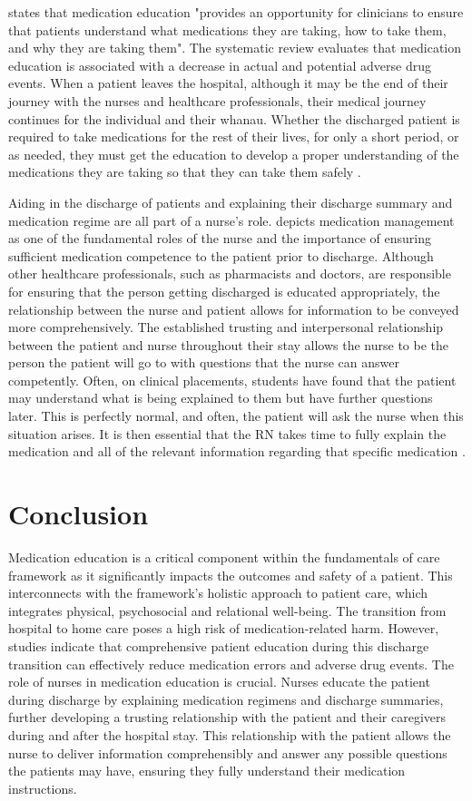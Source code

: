 \documentclass[british,12pt,a4paper]{article}
\begin{document}
\citeauthor{Alper2023} states that medication education "provides an opportunity for clinicians to ensure that patients understand what medications they are taking, how to take them, and why they are taking them". The systematic review evaluates that medication education is associated with a decrease in actual and potential adverse drug events. When a patient leaves the hospital, although it may be the end of their journey with the nurses and healthcare professionals, their medical journey continues for the individual and their whanau. Whether the discharged patient is required to take medications for the rest of their lives, for only a short period, or as needed, they must get the education to develop a proper understanding of the medications they are taking so that they can take them safely \parencite{Yap2016}.

Aiding in the discharge of patients and explaining their discharge summary and medication regime are all part of a nurse's role. \textcite{Sulosaari2014} depicts medication management as one of the fundamental roles of the nurse and the importance of ensuring sufficient medication competence to the patient prior to discharge. Although other healthcare professionals, such as pharmacists and doctors, are responsible for ensuring that the person getting discharged is educated appropriately, the relationship between the nurse and patient allows for information to be conveyed more comprehensively. The established trusting and interpersonal relationship between the patient and nurse throughout their stay allows the nurse to be the person the patient will go to with questions that the nurse can answer competently. Often, on clinical placements, students have found that the patient may understand what is being explained to them but have further questions later. This is perfectly normal, and often, the patient will ask the nurse when this situation arises. It is then essential that the RN takes time to fully explain the medication and all of the relevant information regarding that specific medication \parencite{Flatman2021}.


\section{Conclusion}
Medication education is a critical component within the fundamentals of care framework as it significantly impacts the outcomes and safety of a patient. This interconnects with the framework's holistic approach to patient care, which integrates physical, psychosocial and relational well-being. The transition from hospital to home care poses a high risk of medication-related harm. However, studies indicate that comprehensive patient education during this discharge transition can effectively reduce medication errors and adverse drug events. The role of nurses in medication education is crucial. Nurses educate the patient during discharge by explaining medication regimens and discharge summaries, further developing a trusting relationship with the patient and their caregivers during and after the hospital stay. This relationship with the patient allows the nurse to deliver information comprehensibly and answer any possible questions the patients may have, ensuring they fully understand their medication instructions.
\end{document}
